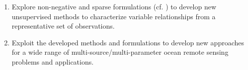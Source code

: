 \documentclass[10pt]{extarticle}
\begin{document}
\begin{enumerate}
    \itemsep 0em 
    \item Explore non-negative and sparse formulations (cf. \cite{parts, fevotte, ozerov, sparse}) to develop new unsupervised methods to characterize variable relationships from a representative set of observations.     
    \item Exploit the developed methods and formulations %
    to develop new approaches for a wide range of multi-source/multi-parameter ocean remote sensing problems and applications. %
\end{enumerate}
\end{document}

